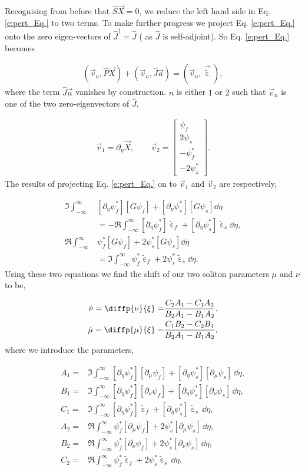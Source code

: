 \documentclass[reprint,
 amsmath,amssymb,
 pra,
]{revtex4-1}
\newcommand{\eq}[1]{
\begin{equation}\begin{aligned}
#1
\end{aligned}\end{equation}}
\DeclareMathOperator{\eps}{\varepsilon}
\begin{document}
Recognising from before that $\hat{S}\vec{X} = 0$, we reduce the left hand side in Eq. \eqref{e:pert_Eq.} to two terms. To make further progress we project Eq. \eqref{e:pert_Eq.} onto the zero eigen-vectors of $\hat{J}^{\dagger} = \hat{J}$ ( as $\hat{J}$ is self-adjoint). So Eq. \eqref{e:pert_Eq.} becomes
\eq{
(\vec{v}_n,\hat{P}\vec{X}) + (\vec{v}_n,\hat{J}\vec{a}) = (\vec{v}_n, \vec{\tilde{\eps}}),
}
where the term $\hat{J}\vec{a}$ vanishes by construction. $n$ is either $1$ or $2$ such that $\vec{v}_n$ is one of the two zero-eigenvectors of $\hat{J}$,
\eq{
\vec{v}_1 = \partial_\eta \vec{X}, \qquad
\vec{v}_2 = \begin{bmatrix}  \psi_f \\ 2\psi_s\\ -\psi_f^*\\ -2\psi_s^* \end{bmatrix}.
}
 The results of projecting Eq. \eqref{e:pert_Eq.} on to $\vec{v}_1$ and $\vec{v}_2$ are respectively,
\eq{\label{e:Im_Re}
\Im \int_{-\infty}^{\infty}& [\partial_\eta \psi_f^*] [G \psi_f] +  [\partial_\eta \psi_s^*] [G \psi_s]  \dd \eta \\&= -\Re \int_{-\infty}^{\infty}  [\partial_\eta \psi_f^*] \tilde{\eps}_f  +[\partial_\eta \psi_s^*] \tilde{\eps}_s   \dd \eta, \\
\Re \int_{-\infty}^{\infty}&  \psi_f^* [G \psi_f] +  2 \psi_s^* [G \psi_s]  \dd \eta \\&= \Im \int_{-\infty}^{\infty}  \psi_f^* \tilde{\eps}_f  + 2\psi_s^* \tilde{\eps}_s   \dd \eta.
}
Using these two equations we find the shift of our two soliton parameters $\mu$ and $\nu$ to be,
\eq{\label{e:mu_nu_shift}
\dot{\nu} = \diffp{\nu}{\xi} =& \frac{C_2 A_1 - C_1 A_2}{B_2 A_1 - B_1 A_2}, \\ 
\dot{\mu} = \diffp{\mu}{\xi} =& \frac{C_1 B_2 - C_2 B_1}{B_2 A_1 - B_1 A_2},
}
where we introduce the parameters, 
\eq{
A_1 =& \Im   \int_{-\infty}^{\infty}   [\partial_\eta \psi_f^* ] [\partial_\mu \psi_f]  + [\partial_\eta \psi_s^* ] [\partial_\mu  \psi_s]  \, \dd \eta ,\\
B_1 =& \Im   \int_{-\infty}^{\infty}   [\partial_\eta \psi_f^*]  [\partial_\nu   \psi_f]  + [\partial_\eta \psi_s^* ][\partial_\nu  \psi_s]  \, \dd \eta ,\\
C_1 =& \Im   \int_{-\infty}^{\infty}   [\partial_\eta \psi_f^* ] \tilde{\eps}_f  + [\partial_\eta \psi_s^* ] \tilde{\eps}_s \, \dd \eta ,\\
A_2 =& \Re   \int_{-\infty}^{\infty}   \psi_f^* [\partial_\mu \psi_f]  + 2 \psi_s^* [\partial_\mu \psi_s]  \, \dd \eta ,\\
B_2 =& \Re   \int_{-\infty}^{\infty}   \psi_f^* [\partial_\nu \psi_f]  + 2 \psi_s^* [\partial_\nu  \psi_s]  \, \dd \eta ,\\
C_2 =& \Re   \int_{-\infty}^{\infty}   \psi_f^* \tilde{\eps}_f    + 2 \psi_s^* \tilde{\eps}_s   \, \dd \eta .\\
}
\end{document}
